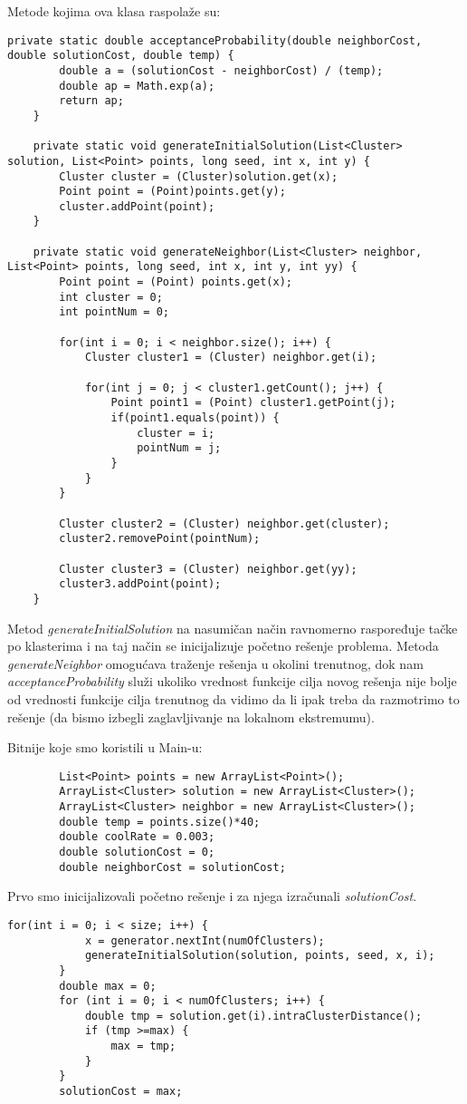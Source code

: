 \documentclass[a4paper]{article}
\begin{document}
Metode kojima ova klasa raspolaže su:
\begin{lstlisting}[title=Program 5: Klasa Main i njene metode]
	private static double acceptanceProbability(double neighborCost, double solutionCost, double temp) { 
		double a = (solutionCost - neighborCost) / (temp); 
		double ap = Math.exp(a); 
		return ap;
	} 

	private static void generateInitialSolution(List<Cluster> solution, List<Point> points, long seed, int x, int y) { 
		Cluster cluster = (Cluster)solution.get(x); 
		Point point = (Point)points.get(y); 
		cluster.addPoint(point); 
	} 

	private static void generateNeighbor(List<Cluster> neighbor, List<Point> points, long seed, int x, int y, int yy) { 
		Point point = (Point) points.get(x); 
		int cluster = 0; 
		int pointNum = 0; 

		for(int i = 0; i < neighbor.size(); i++) { 
			Cluster cluster1 = (Cluster) neighbor.get(i); 

			for(int j = 0; j < cluster1.getCount(); j++) { 
				Point point1 = (Point) cluster1.getPoint(j); 
				if(point1.equals(point)) { 
					cluster = i; 
					pointNum = j; 
				} 
			} 
		} 

		Cluster cluster2 = (Cluster) neighbor.get(cluster); 
		cluster2.removePoint(pointNum); 

		Cluster cluster3 = (Cluster) neighbor.get(yy); 
		cluster3.addPoint(point); 
	} 
\end{lstlisting}

Metod \textit{generateInitialSolution} na nasumičan način ravnomerno raspoređuje tačke po klasterima i na taj način se inicijalizuje početno rešenje problema. Metoda \textit{generateNeighbor} omogućava traženje rešenja u okolini trenutnog, dok nam \textit{acceptanceProbability} služi ukoliko vrednost funkcije cilja novog rešenja nije bolje od vrednosti funkcije cilja trenutnog da vidimo da li ipak treba da razmotrimo to rešenje (da bismo izbegli zaglavljivanje na lokalnom ekstremumu).

Bitnije koje smo koristili u Main-u:
\begin{lstlisting}
		List<Point> points = new ArrayList<Point>();
		ArrayList<Cluster> solution = new ArrayList<Cluster>();
		ArrayList<Cluster> neighbor = new ArrayList<Cluster>();
		double temp = points.size()*40;
		double coolRate = 0.003;
		double solutionCost = 0;
		double neighborCost = solutionCost;
\end{lstlisting}

Prvo smo inicijalizovali početno rešenje i za njega izračunali \textit{solutionCost}. 
\begin{lstlisting}[title=Program 6: Inicijalizacija početnog rešenja]
		for(int i = 0; i < size; i++) {
			x = generator.nextInt(numOfClusters);
			generateInitialSolution(solution, points, seed, x, i);
		}
		double max = 0;
		for (int i = 0; i < numOfClusters; i++) {
			double tmp = solution.get(i).intraClusterDistance();
			if (tmp >=max) {
				max = tmp;
			}
		}
		solutionCost = max;
\end{lstlisting}
\end{document}
